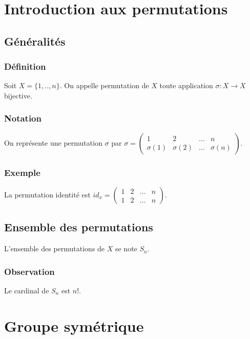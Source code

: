 \documentclass[a4paper,10pt]{book} %
\begin{document}
\section{Introduction aux permutations}
\subsection{Généralités}
\subsubsection{Définition}
Soit $X=\{1,..,n\}$. On appelle permutation de $X$ toute application $\sigma : X\rightarrow X$ bijective.

\subsubsection{Notation}
On représente une permutation $\sigma$ par $\sigma=\begin{pmatrix}
1 & 2 & \dots & n \\
\sigma(1) & \sigma(2) & \dots & \sigma(n)
\end{pmatrix}$.

\subsubsection{Exemple}
La permutation identité est $id_x=\begin{pmatrix}
1&2&\dots&n\\
1&2&\dots&n
\end{pmatrix}$.

\subsection{Ensemble des permutations}
L'ensemble des permutations de $X$ se note $S_n$.

\subsubsection{Observation}
Le cardinal de $S_n$ est $n!$.

\section{Groupe symétrique}
\end{document}
